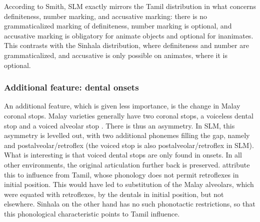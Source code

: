 \documentclass[a4paper,10pt]{article}
\begin{document}
According to Smith, SLM exactly mirrors the Tamil distribution in what concerns definiteness, number marking, and accusative marking: there is no grammaticalized marking of definiteness, number marking is optional, and accusative marking is obligatory for animate objects and optional for inanimates. This contrasts with the Sinhala distribution, where definiteness and number are grammaticalized, and accusative is only possible on animates, where it is optional.
 

\subsubsection{Additional feature: dental onsets} 
An additional feature, which is given less importance, is the change in Malay coronal stops. Malay varieties generally have two coronal stops, a voiceless dental stop \phonem{\dentt} and a voiced alveolar stop . There is thus an asymmetry. In SLM, this asymmetry is levelled out, with two additional phonemes filling the gap, namely \phonem{\dentd} and postalveolar/retroflex \phonem{\postalvt}  (the voiced stop is also postalveolar/retroflex in SLM). What is interesting is that voiced dental stops are only found in onsets. In all other environments, the original articulation further back  is preserved. \citet[202]{SmithEtAl2004} attribute this to influence from Tamil, whose phonology does not permit retroflexes  in initial position. This would have led to substitution of the Malay alveolars, which were equated with retroflexes, by the dentals in initial position, but not elsewhere. Sinhala on the other hand has no such phonotactic restrictions, so that this phonological characteristic points to Tamil influence.
\end{document}
